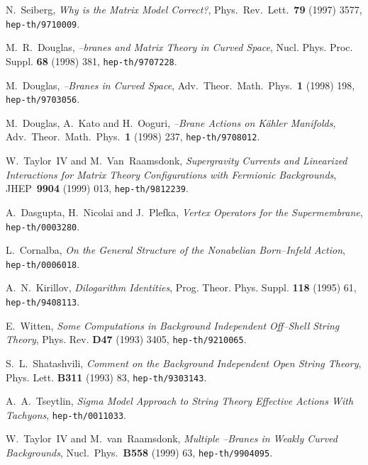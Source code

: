 \documentclass[a4paper,11pt]{article}
\begin{document}
\begin{thebibliography}{99}
{  {\small N.~Seiberg, \textit{Why is the Matrix Model
Correct?}, Phys.\ Rev.\ Lett.\ \textbf{79} (1997) 3577, \texttt{
hep-th/9710009}. }

  {\small M.~R.~Douglas, \textit{\coordHE{}--branes and
Matrix Theory in Curved Space}, Nucl. Phys. Proc. Suppl. \textbf{68} (1998)
381, \texttt{hep-th/9707228}. }

  {\small M.~Douglas, \textit{\coordHE{}--Branes in Curved Space},
Adv.\ Theor.\ Math.\ Phys.\ \textbf{1} (1998) 198, \texttt{hep-th/9703056}. }

  {\small M.~Douglas, A.~Kato and H.~Ooguri, \textit{\coordHE{}--Brane
Actions on K\"ahler Manifolds}, Adv.\ Theor.\ Math.\ Phys.\ \textbf{1}
(1998) 237, \texttt{hep-th/9708012}. }

  {\small W.~Taylor~IV and M.~Van~Raamsdonk, 
\textit{Supergravity Currents and Linearized Interactions for Matrix Theory
Configurations with Fermionic Backgrounds}, JHEP\ \textbf{9904} (1999) 013, 
\texttt{hep-th/9812239}. }

  {\small A.~Dasgupta, H.~Nicolai and J.~Plefka, \textit{Vertex
Operators for the Supermembrane}, \texttt{hep-th/0003280}. }

  {\small L.~Cornalba, \textit{On the General 
Structure of the Nonabelian Born--Infeld Action}, 
\texttt{hep-th/0006018}. }

  {\small A.~N.~Kirillov, \textit{Dilogarithm 
Identities}, Prog. Theor. Phys. Suppl. \textbf{118} (1995) 61, 
\texttt{hep-th/9408113}. }

  {\small E.~Witten, \textit{Some Computations in 
Background Independent Off--Shell String Theory}, Phys. Rev. 
\textbf{D47} (1993) 3405, \texttt{hep-th/9210065}. }

  {\small S.~L.~Shatashvili, \textit{Comment on 
the Background Independent Open String Theory}, Phys. Lett. 
\textbf{B311} (1993) 83, \texttt{hep-th/9303143}. }

  {\small A.~A.~Tseytlin, \textit{Sigma Model 
Approach to String Theory Effective Actions With Tachyons}, 
\texttt{hep-th/0011033}. }

  {\small W.~Taylor~IV and M.~van~Raamsdonk, 
\textit{Multiple \coordHE{}--Branes in Weakly Curved Backgrounds}, Nucl.\ Phys.\ 
\textbf{B558} (1999) 63, \texttt{hep-th/9904095}. }

}
\end{thebibliography}
\end{document}
